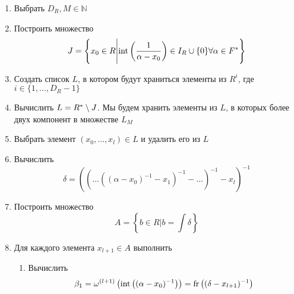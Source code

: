 \documentclass[_00_autoref.tex]{subfiles}
\begin{document}
    \begin{enumerate}
        \item Выбрать $D_R, M \in \mathbb{N}$
        
        \item Построить множество
        \begin{equation*}
            J = \left\{
                x_0 \in R \Bigg| \textrm{int}\left(\frac{1}{\alpha-x_0}\right) \in I_{R} \cup \{0\} \forall \alpha \in F^{*}
            \right\}
        \end{equation*}
        
        \item Создать список $L$, в котором будут храниться элементы из $R^i$, где $i \in \{1, \ldots, D_R - 1\}$

        \item Вычислить $L = R^{*} \setminus J$.
        Мы будем хранить элементы из $L$, в которых более двух компонент в множестве $L_M$

        \item\label{step:every_element_in_L} Выбрать элемент $(x_0, \ldots, x_l) \in L$ и удалить его из $L$

        \item Вычислить
        \begin{equation*}
            \delta = \left(
                \left(
                    \ldots\left(
                        \left(
                            \alpha - x_0
                        \right)^{-1} - x_1
                    \right)^{-1} - \ldots
                \right)^{-1} - x_l
            \right)^{-1}
        \end{equation*}

        \item Построить множество
        \begin{equation*}
            A = \left\{
                b \in R \big| b = \int{\delta}
            \right\}
        \end{equation*}

        \item\label{step:every_element_in_A} Для каждого элемента $x_{l+1} \in A$ выполнить
        \begin{enumerate}
            \item Вычислить
            \begin{equation*}
                \beta_1 = \omega^{(l+1)}\left(
                    \textrm{int}\left((\alpha-x_0)^{-1}\right)
                \right) = \textrm{fr}\left((\delta-x_{l+1})^{-1}\right)
            \end{equation*}


\end{enumerate}
\end{enumerate}
\end{document}
